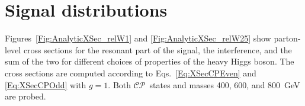 
\graphicspath{{chapt_dutch/}{intro/}{chapt2/}{chapt3/}{chapt4/}{chapt5/}{chapt6/}{chapt7/}}
\renewcommand\evenpagerightmark{{\scshape\small Appendix A}}
\renewcommand\oddpageleftmark{{\scshape\small Signal Generation}}

\renewcommand{\bibname}{References}

\hyphenation{}

\chapter[Signal distributions]%
{Signal distributions}\label{app2}

%
Figures~\ref{Fig:AnalyticXSec_relW1} and \ref{Fig:AnalyticXSec_relW25} show parton-level cross sections for the resonant part of the signal, the interference, and the sum of the two for different choices of properties of the heavy Higgs boson.
The cross sections are computed according to Eqs.~\ref{Eq:XSecCPEven} and \ref{Eq:XSecCPOdd} with $g = 1$.
Both $\mathcal{CP}$~states and masses 400, 600, and 800~GeV are probed.

